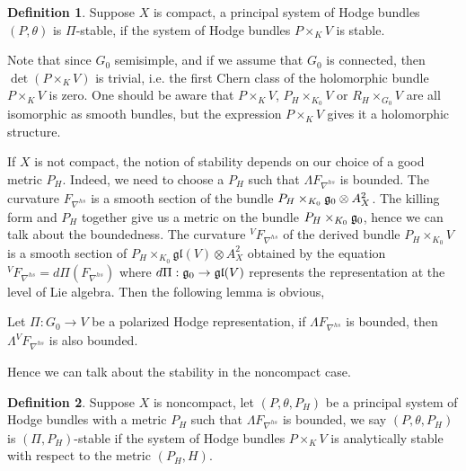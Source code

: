 \documentclass[aspectratio=169, 10pt]{beamer}
\theoremstyle{definition}
\newtheorem{Def}{Definition}
\theoremstyle{example}
\begin{document}
	\begin{frame}[allowframebreaks]
		\begin{Def}
			Suppose $X$ is compact, a principal system of Hodge bundles $(P,\theta)$ is $\Pi$-stable, if the system of Hodge bundles $P\times_K V$ is stable.
		\end{Def}
		Note that since $G_0$ semisimple, and if we assume that $G_0$ is connected, then $\det(P\times_K V)$ is trivial, i.e. the first Chern class of the holomorphic bundle $P\times_K V$ is zero. One should be aware that $P\times_K V$, $P_H\times_{K_0} V$ or $R_H\times_{G_0} V$ are all isomorphic as smooth bundles, but the expression $P\times_K V$ gives it a holomorphic structure.

		If $X$ is not compact, the notion of stability depends on our choice of a good metric $P_H$. Indeed, we need to choose a $P_H$ such that $\Lambda F_{\nabla^{hs}}$ is bounded. The curvature $F_{\nabla^{hs}}$ is a smooth section of the bundle $P_H\times_{K_0}\mathfrak{g}_0\otimes A_X^2$. The killing form and $P_H$ together give us a metric on the bundle $P_H\times_{K_0}\mathfrak{g}_0$, hence we can talk about the boundedness. The curvature $^{V}F_{\nabla^{hs}}$ of the derived bundle $P_H\times_{K_0} V$ is a smooth section of $P_H\times_{K_0}\mathfrak{gl}(V)\otimes A_X^2$ obtained by the equation $^{V}F_{\nabla^{hs}}=d\Pi(F_{\nabla^{hs}})$ where $d\Pi:\mathfrak{g}_0\to \mathfrak{gl}(V)$ represents the representation at the level of Lie algebra. Then the following lemma is obvious,
		\begin{lemma}
			Let $\Pi: G_0\to V$ be a polarized Hodge representation, if $\Lambda F_{\nabla^{hs}}$ is bounded, then $\Lambda ^{V}F_{\nabla^{hs}}$ is also bounded.
		\end{lemma}
		Hence we can talk about the stability in the noncompact case.
		\begin{Def}
			Suppose $X$ is noncompact, let $(P,\theta, P_H)$ be a principal system of Hodge bundles with a metric $P_H$ such that $\Lambda F_{\nabla^{hs}}$ is bounded, we say $(P,\theta, P_H)$ is $(\Pi, P_H)$-stable if the system of Hodge bundles $P\times_K V$ is analytically stable with respect to the metric $(P_H, H)$.
		\end{Def}	
	\end{frame}
\end{document}
